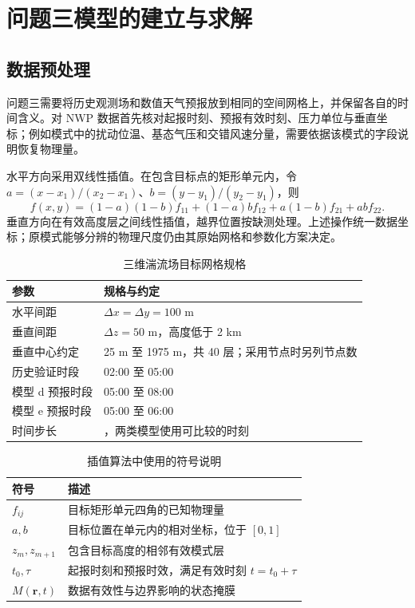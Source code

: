 \section{问题三模型的建立与求解}
\subsection{数据预处理}
问题三需要将历史观测场和数值天气预报放到相同的空间网格上，并保留各自的时间含义。对 NWP 数据首先核对起报时刻、预报有效时刻、压力单位与垂直坐标；例如模式中的扰动位温、基态气压和交错风速分量，需要依据该模式的字段说明恢复物理量。

水平方向采用双线性插值。在包含目标点的矩形单元内，令 $a=(x-x_1)/(x_2-x_1)$、$b=(y-y_1)/(y_2-y_1)$，则
\begin{equation}
f(x,y)=(1-a)(1-b)f_{11}+(1-a)bf_{12}+a(1-b)f_{21}+abf_{22}.
\end{equation}
垂直方向在有效高度层之间线性插值，越界位置按缺测处理。上述操作统一数据坐标；原模式能够分辨的物理尺度仍由其原始网格和参数化方案决定。
\begin{table}[H]\centering\caption{三维湍流场目标网格规格}
\begin{tabularx}{\linewidth}{lY}\toprule
参数 & 规格与约定\\\midrule
水平间距 & $\Delta x=\Delta y=100$ m\\
垂直间距 & $\Delta z=50$ m，高度低于 2 km\\
垂直中心约定 & 25 m 至 1975 m，共 40 层；采用节点时另列节点数\\
历史验证时段 & 02:00 至 05:00\\
模型 d 预报时段 & 05:00 至 08:00\\
模型 e 预报时段 & 05:00 至 06:00\\
时间步长 & ，两类模型使用可比较的时刻\\\bottomrule
\end{tabularx}\end{table}
\begin{table}[H]\centering\caption{插值算法中使用的符号说明}
\begin{tabularx}{\linewidth}{lY}\toprule
符号 & 描述\\\midrule
$f_{ij}$ & 目标矩形单元四角的已知物理量\\
$a,b$ & 目标位置在单元内的相对坐标，位于 $[0,1]$\\
$z_m,z_{m+1}$ & 包含目标高度的相邻有效模式层\\
$t_0,\tau$ & 起报时刻和预报时效，满足有效时刻 $t=t_0+\tau$\\
$M(\bm r,t)$ & 数据有效性与边界影响的状态掩膜\\\bottomrule
\end{tabularx}\end{table}
